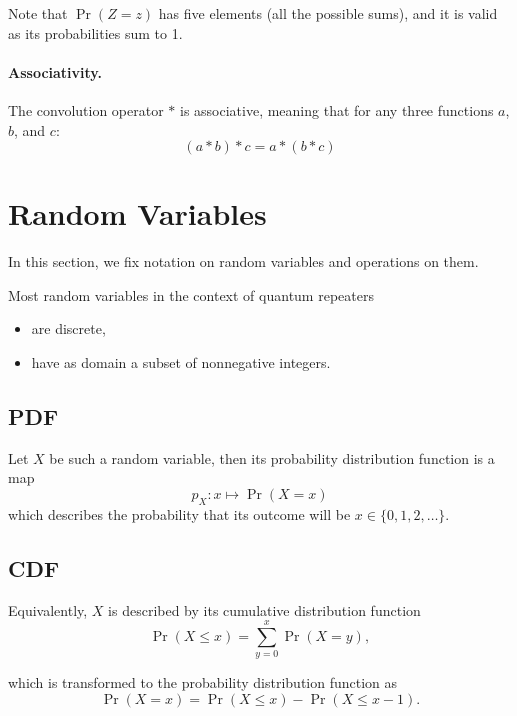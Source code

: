 \documentclass{masterthesis}
\begin{document}
Note that $\Pr(Z = z)$ has five elements (all the possible sums), and it is valid as its probabilities sum to 1.

\paragraph*{Associativity.}
\begin{samepage}
    The convolution operator \( * \) is associative, meaning that for any three functions \(a\), \(b\), and \(c\):
    \begin{equation}\label{eq:convolution_associativity} 
        (a * b) * c = a * (b * c)
    \end{equation}        
\end{samepage}

\section{Random Variables}

In this section, we fix notation on random variables and operations on them. 

Most random variables in the context of quantum repeaters
\begin{itemize}
    \item are discrete,
    \item have as domain a subset of nonnegative integers.
\end{itemize}

\subsection*{PDF}\label{paragraph:pdf}
Let $X$ be such a random variable, then its probability distribution function is a map
\begin{equation}
    p_X : x \mapsto \Pr(X = x)
\end{equation} 
which describes the probability that its outcome will be $x \in \{0, 1, 2, \ldots \}$.

\subsection*{CDF}\label{paragraph:cdf}
Equivalently, $X$ is described by its cumulative distribution function
\begin{equation}
    \Pr(X \leq x) = \sum_{y=0}^{x} \Pr(X = y),
\end{equation}

which is transformed to the probability distribution function as 
\begin{equation}
    \Pr(X = x) = \Pr(X \leq x) - \Pr(X \leq x - 1).
\end{equation}
\end{document}
